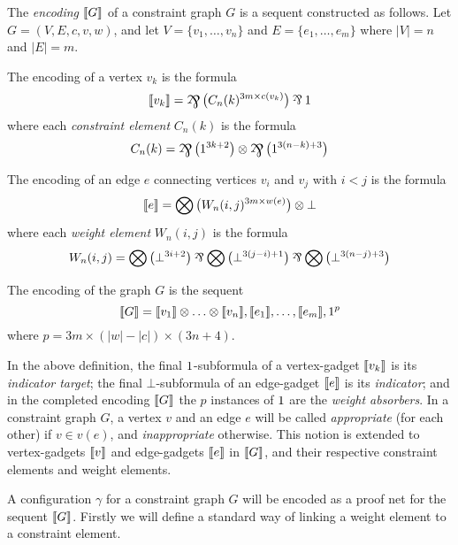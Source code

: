 \documentclass{sigplanconf-modified}
\begin{document}
\begin{definition}
\label{def:graph encoding}
The \emph{encoding} $\llbracket G\rrbracket$ of a constraint graph $G$ is a sequent constructed as follows.
%
Let $G=(V,E,c,v,w)$, and let $V=\{v_1,\dotsc,v_n\}$ and $E=\{e_1,\dotsc,e_m\}$ where $|V|=n$ and $|E|=m$.

\noindent
The encoding of a vertex $v_k$ is the formula
\[
	\itn{v_k} = \bigparr\big(C_n(k)^{3m\times c(v_k)} \big)\parr\1
\]
where each \emph{constraint element} $C_n(k)$ is the formula
\[
	C_n(k) = \bigparr\big(1^{3k+2}\big) \tn \bigparr\big(1^{3(n-k)+3}\big)
\]

\noindent
The encoding of an edge $e$ connecting vertices $v_i$ and $v_j$ with $i<j$ is the formula
\[
	\llbracket e\rrbracket = \bigotimes\big(W_n(i,j)^{3m\times w(e)}\big)\otimes\bot
\]
where each \emph{weight element} $W_n(i,j)$ is the formula
\[
	W_n(i,j) = \bigtn\big(\bot^{3i+2}\big)\parr\bigtn\big(\bot^{3(j-i)+1}\big)\parr\bigtn\big(\bot^{3(n-j)+3}\big)
\]

\noindent
The encoding of the graph $G$ is the sequent
\[
	\llbracket G\rrbracket = \llbracket v_1\rrbracket\otimes\dotso\otimes\llbracket v_n\rrbracket, \llbracket e_1\rrbracket,\dotsc,\llbracket e_m\rrbracket, 1^p
\]
where $p=3m\times(|w|-|c|)\times(3n+4)$.

\end{definition}



In the above definition, the final $1$-subformula of a vertex-gadget $\llbracket v_k\rrbracket$ is its \emph{indicator target}; the final $\bot$-subformula of an edge-gadget $\llbracket e\rrbracket$ is its \emph{indicator}; and in the completed encoding $\llbracket G\rrbracket$ the $p$ instances of $1$ are the \emph{weight absorbers}.
%
In a constraint graph $G$, a vertex $v$ and an edge $e$ will be called \emph{appropriate} (for each other) if $v\in v(e)$, and \emph{inappropriate} otherwise.
%
This notion is extended to vertex-gadgets $\llbracket v\rrbracket$ and edge-gadgets $\llbracket e\rrbracket$ in $\llbracket G\rrbracket$, and their respective constraint elements and weight elements.



A configuration $\gamma$ for a constraint graph $G$ will be encoded as a proof net for the sequent $\llbracket G\rrbracket$.
%
Firstly we will define a standard way of linking a weight element to a constraint element.
\end{document}
